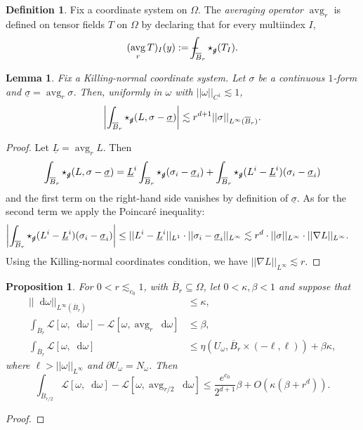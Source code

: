 \documentclass[reqno,12pt,letterpaper]{amsart}
\DeclareMathOperator{\avg}{avg}
\newcommand*\dif{\mathop{}\!\mathrm{d}}
\newcommand{\Lagrange}{\mathscr L}
\newcommand{\dfn}[1]{\emph{#1}\index{#1}}
\newtheorem{lemma}[theorem]{Lemma}
\newtheorem{proposition}[theorem]{Proposition}
\theoremstyle{definition}
\newtheorem{definition}[theorem]{Definition}
\numberwithin{equation}{section}
\def\Xint#1{\mathchoice
{\XXint\displaystyle\textstyle{#1}}%
{\XXint\textstyle\scriptstyle{#1}}%
{\XXint\scriptstyle\scriptscriptstyle{#1}}%
{\XXint\scriptscriptstyle\scriptscriptstyle{#1}}%
\!\int}
\def\XXint#1#2#3{{\setbox0=\hbox{$#1{#2#3}{\int}$ }
\vcenter{\hbox{$#2#3$ }}\kern-.6\wd0}}
\def\dashint{\Xint-}
\begin{document}
\begin{definition}
Fix a coordinate system on $\Omega$.
The \dfn{averaging operator} $\avg_r$ is defined on tensor fields $T$ on $\Omega$ by declaring that for every multiindex $I$,
$$(\avg_r T)_I(y) := \dashint_{\overline B_r} \star_{\slashed g} (T_I).$$
\end{definition}

\begin{lemma}
Fix a Killing-normal coordinate system.
Let $\sigma$ be a continuous $1$-form and $\underline \sigma = \avg_r \sigma$. Then, uniformly in $\omega$ with $||\omega||_{C^1} \lesssim 1$,
$$\left|\int_{\overline B_r} \star_{\slashed g} (L, \sigma - \underline \sigma) \right| \lesssim r^{d + 1} ||\sigma||_{L^\infty(\overline B_r)}.$$
\end{lemma}
\begin{proof}
Let $\underline L = \avg_r L$. Then
$$\int_{\overline B_r} \star_{\slashed g} (L, \sigma - \underline \sigma) = \underline L^i \int_{\overline B_r} \star_{\slashed g} (\sigma_i - \underline \sigma_i) + \int_{\overline B_r} \star_{\slashed g} (L^i - \underline L^i)(\sigma_i - \underline \sigma_i)$$
and the first term on the right-hand side vanishes by definition of $\underline \sigma$.
As for the second term we apply the Poincar\'e inequality:
\begin{align*}
\left|\int_{\overline B_r} \star_{\slashed g} (L^i - \underline L^i)(\sigma_i - \underline \sigma_i)\right| &\leq ||L^i - \underline L^i||_{L^1} \cdot ||\sigma_i - \underline \sigma_i||_{L^\infty} \lesssim r^d \cdot ||\sigma||_{L^\infty} \cdot ||\nabla L||_{L^\infty}.
\end{align*}
Using the Killing-normal coordinates condition, we have $||\nabla L||_{L^\infty} \lesssim r$.
\end{proof}



\begin{proposition}\label{dGL Laplace}
For $0 < r \lesssim_{c_0} 1$, with $\overline B_r \subseteq \Omega$, let $0 < \kappa, \beta < 1$ and suppose that 
\begin{align}
||\dif \omega||_{L^\infty(\overline B_r)} &\leq \kappa, \label{dGL Linfty}\\
\int_{\overline B_r} \Lagrange[\omega, \dif \omega] - \Lagrange[\omega, \avg_r \dif \omega] &\leq \beta, \label{dGL osc}\\
\int_{\overline B_r} \Lagrange[\omega, \dif \omega] &\leq \eta(U_\omega, \overline B_r \times (-\ell, \ell)) + \beta\kappa, \label{dGL mean curv}
\end{align}
where $\ell > ||\omega||_{L^\infty}$ and $\partial U_\omega = N_\omega$. Then 
$$\int_{\overline B_{r/2}} \Lagrange[\omega, \dif \omega] - \Lagrange[\omega, \avg_{r/2} \dif \omega] \leq \frac{e^{c_0}}{2^{d + 1}} \beta + O(\kappa (\beta + r^d)).$$
\end{proposition}
\begin{proof}

\end{proof}
\end{document}
